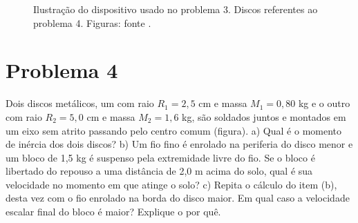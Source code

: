 \documentclass[a4paper, 11pt]{article}
\begin{document}
\begin{figure}
\centering
{}
\caption{ Ilustração do dispositivo usado no problema 3.  Discos referentes ao problema 4. Figuras: fonte \cite{Young2004}.}
\end{figure}

\section*{Problema 4}
Dois discos metálicos, um com raio $R_1=2,5$ cm e massa $M_1 = 0,80$ kg e o outro com raio $R_2= 5,0$ cm e massa $M_2=1,6$ kg, são soldados juntos e montados em um eixo sem atrito passando pelo centro comum (figura). a) Qual é o momento de inércia dos dois discos? b) Um fio fino é enrolado na periferia do disco menor e um bloco de 1,5 kg é suspenso pela extremidade livre do fio. Se o bloco é libertado do repouso a uma distância de 2,0 m acima do solo, qual é sua velocidade no momento em que atinge o solo? c) Repita o cálculo do item (b), desta vez com o fio enrolado na borda do disco maior. Em qual caso a velocidade escalar final do bloco é maior? Explique o por quê.
\end{document}
